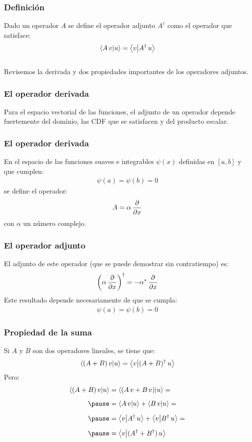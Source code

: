 \documentclass[12pt]{beamer}
\begin{document}
\begin{frame}
\frametitle{Definición}
Dado un operador $A$ se define el operador adjunto $A^{\dagger}$ como el operador que satisface:
\pause
\begin{align*}
\braket{A \, v}{u} = \braket{v}{A^{\dagger} \, u}
\end{align*}
\\
\bigskip
\pause
Revisemos la derivada y dos propiedades importantes de los operadores adjuntos.
\end{frame}
\begin{frame}
\frametitle{El operador derivada}
Para el espacio vectorial de las funciones, el adjunto de un operador depende fuertemente del dominio, las CDF que se satisfacen y del producto escalar.
\end{frame}
\begin{frame}
\frametitle{El operador derivada}
En el espacio de las funciones suaves e integrables $\psi (x)$ definidas en $[a, b]$ y que cumplen:
\pause
\begin{align*}
\psi(a) = \psi(b) = 0
\end{align*}
\pause
se define el operador:
\pause
\begin{align*}
A = \alpha \, \pdv{x}
\end{align*}
con $\alpha$ un número complejo.
\end{frame}
\begin{frame}
\frametitle{El operador adjunto}
El adjunto de este operador (que se puede demostrar sin contratiempo) es:
\pause
\begin{align*}
\left( \alpha \, \pdv{x} \right)^{\dagger} = - \alpha^{*} \, \pdv{x}
\end{align*}
Este resultado depende necesariamente de que se cumpla:
\begin{align*}
\psi(a) = \psi(b) = 0
\end{align*}
\end{frame}
\begin{frame}
\frametitle{Propiedad de la suma}
Si $A$ y $B$ son dos operadores lineales, se tiene que:
\pause
\begin{align*}
\braket{(A + B) \, v}{u} = \braket{v}{(A + B)^{\dagger} \, u}
\end{align*}
\pause
Pero:
\pause
\begin{eqnarray*}
\begin{aligned}
\braket{(A + B) \, v}{u} &= \braket{(A \, v + B \, v) }{u} = \\[0.5em] \pause
&= \braket{A \, v}{u} + \braket{B \, v}{u} = \\[0.5em] \pause
&= \braket{v}{A^{\dagger} \, u} + \braket{v}{B^{\dagger} \, u} = \\[0.5em]  \pause
&= \braket{v}{(A^{\dagger} + B^{\dagger}) \, u}
\end{aligned}
\end{eqnarray*}
\end{frame}
\end{document}
